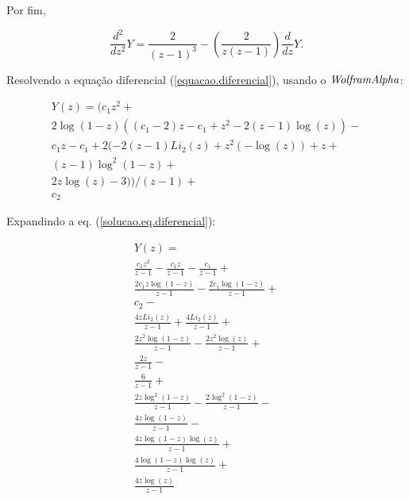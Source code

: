 \documentclass[a4paper,10pt]{article}
\begin{document}
Por fim,

\begin{equation}
 \displaystyle \frac{d^2}{dz^2}Y = \frac{2}{(z - 1)^3} -  \left( \displaystyle \frac{2}{z(z - 1)} \right) \displaystyle \frac{d}{dz}Y.
 \label{equacao.diferencial}
\end{equation}

Resolvendo a equação diferencial (\ref{equacao.diferencial}), usando o $\it{Wolfram Alpha}$:

\begin{equation}
\begin{array}{lcl} 
Y(z) = (c_1 z^2+ \\
2 \log(1-z) ((c_1-2) z-c_1+z^2-2 (z-1) \log(z))-\\
c_1 z-c_1+2 (-2 (z-1) Li_2(z)+z^2 (-\log(z))+z+\\
(z-1) \log^2(1-z)+\\
2 z \log(z)-3))/(z-1)+\\
c_2
\end{array}  
\label{solucao.eq.diferencial}
\end{equation}

Expandindo a eq. (\ref{solucao.eq.diferencial}):

\begin{equation}
\begin{array}{lcl} 
 Y(z) = \\
 \displaystyle \frac{c_1 z^2}{z-1}-\displaystyle \frac{c_1 z}{z-1}- \displaystyle \frac{c_1}{z-1}+\\
 \displaystyle \frac{2 c_1 z \log(1-z)}{z-1}-\displaystyle \frac{2 c_1 \log(1-z)}{z-1}+\\
 c_2-\\
 \displaystyle \frac{4 z Li_2(z)}{z-1}+\displaystyle \frac{4 Li_2(z)}{z-1}+\\
 \displaystyle \frac{2 z^2 \log(1-z)}{z-1}-\displaystyle \frac{2 z^2 \log(z)}{z-1}+\\
 \displaystyle \frac{2 z}{z-1}-\\
 \displaystyle \frac{6}{z-1}+\\
 \displaystyle \frac{2 z \log^2(1-z)}{z-1}-\displaystyle \frac{2 \log^2(1-z)}{z-1}-\\
 \displaystyle \frac{4 z \log(1-z)}{z-1}-\\
 \displaystyle \frac{4 z \log(1-z) \log(z)}{z-1}+\\
 \displaystyle \frac{4 \log(1-z) \log(z)}{z-1} + \\
  \displaystyle \frac{4 z \log(z)}{z-1}
\end{array}
\label{solucao.eq.diferencial.expandida}
\end{equation}
\end{document}
